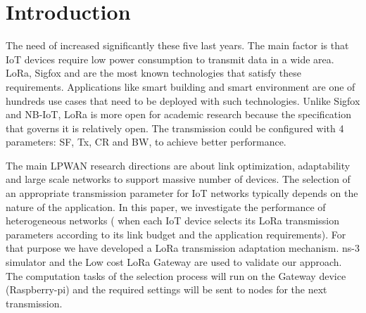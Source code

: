 \section{Introduction} \label{sec:Introduction}

The need of  increased significantly these five last years.
The main factor is that IoT devices require low power consumption to transmit data in a wide area.
LoRa,
	Sigfox and  are the most known technologies that satisfy these requirements.
Applications like smart building and smart environment are one of hundreds use cases that need to be deployed with such technologies.
Unlike Sigfox and NB-IoT,
	LoRa is more open for academic research because the specification that governs it is relatively open.
The transmission could be configured with 4 parameters:
	\ac{SF},
	\ac{Tx},
	\ac{CR} and \ac{BW},
	to achieve better performance.

The main LPWAN research directions are about link optimization,
	adaptability and large scale networks to support massive number of devices.
The selection of an appropriate transmission parameter for IoT networks typically depends on the nature of the application.
In this paper,
	we investigate the performance of heterogeneous networks (\ie\red{,}
when each IoT device selects its LoRa transmission parameters according to its link budget and the application requirements).
For that purpose\red{,} we have developed a LoRa transmission adaptation mechanism.
 ns-3 simulator and the Low cost LoRa Gateway \cite{lowcostloragateway} are used to validate our approach.
The computation tasks of the selection process will run on the Gateway device (Raspberry-pi) and the required settings will be sent to nodes for the next transmission.

